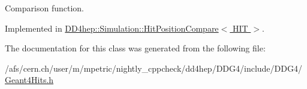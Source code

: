 Comparison function. 

Implemented in \hyperlink{struct_d_d4hep_1_1_simulation_1_1_hit_position_compare_ac7b865b38eddb2c693d8a1eefa10d731}{DD4hep::Simulation::HitPositionCompare$<$ HIT $>$}.

The documentation for this class was generated from the following file:\begin{DoxyCompactItemize}
\item 
/afs/cern.ch/user/m/mpetric/nightly\_\-cppcheck/dd4hep/DDG4/include/DDG4/\hyperlink{_geant4_hits_8h}{Geant4Hits.h}\end{DoxyCompactItemize}
